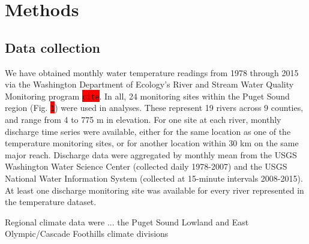 \documentclass{article}
\begin{document}
\section*{Methods}
\subsection*{Data collection}
We have obtained monthly water temperature readings from 1978 through 2015 via the Washington Department of Ecology's River and Stream Water Quality Monitoring program \colorbox{red}{\lstinline{cite}}. In all, 24 monitoring sites within the Puget Sound region (Fig. \colorbox{red}{\lstinline{1}}) were used in analyses. These represent 19 rivers across 9 counties, and range from 4 to 775 m in elevation. For one site at each river, monthly discharge time series were available, either for the same location as one of the temperature monitoring sites, or for another location within 30 km on the same major reach. Discharge data were aggregated by monthly mean from the USGS Washington Water Science Center (collected daily 1978-2007) and the USGS National Water Information System (collected at 15-minute intervals 2008-2015). At least one discharge monitoring site was available for every river represented in the temperature dataset.


Regional climate data were ... the Puget Sound Lowland and East Olympic/Cascade Foothills climate divisions
\end{document}
